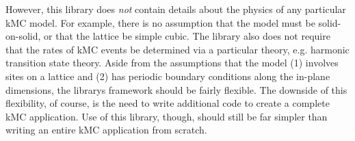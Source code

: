 However, this library does {\itshape not} contain details about the physics of any particular k\+MC model. For example, there is no assumption that the model must be solid-\/on-\/solid, or that the lattice be simple cubic. The library also does not require that the rates of k\+MC events be determined via a particular theory, e.\+g. harmonic transition state theory. Aside from the assumptions that the model (1) involves sites on a lattice and (2) has periodic boundary conditions along the in-\/plane dimensions, the library\textquotesingle{}s framework should be fairly flexible. The downside of this flexibility, of course, is the need to write additional code to create a complete k\+MC application. Use of this library, though, should still be far simpler than writing an entire k\+MC application from scratch. 